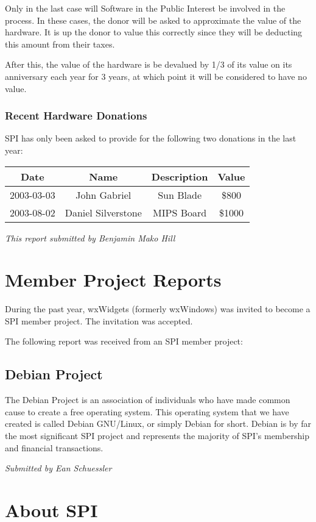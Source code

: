 \documentclass[letterpaper]{report}
\begin{document}
Only in the last case will Software in the Public Interest be involved
in the process. In these cases, the donor will be asked to approximate
the value of the hardware. It is up the donor to value this correctly
since they will be deducting this amount from their taxes.

After this, the value of the hardware is be devalued by 1/3 of its
value on its anniversary each year for 3 years, at which point it
will be considered to have no value.


\subsection{Recent Hardware Donations}

SPI has only been asked to provide for the following two donations
in the last year:

\begin{tabular}{|c|c|c|c|}
\hline
Date & Name & Description & Value\tabularnewline
\hline
\hline
2003-03-03 & John Gabriel & Sun Blade & \$800\tabularnewline
\hline
2003-08-02 & Daniel Silverstone & MIPS Board & \$1000\tabularnewline
\hline
\end{tabular}

\emph{This report submitted by Benjamin Mako Hill}


\chapter{Member Project Reports}

During the past year, wxWidgets (formerly wxWindows) was invited to
become a SPI member project. The invitation was accepted.

The following report was received from an SPI member project:


\section{Debian Project}

The Debian Project is an association of individuals who have made
common cause to create a free operating system. This operating system
that we have created is called Debian GNU/Linux, or simply Debian
for short. Debian is by far the most significant SPI project and represents
the majority of SPI's membership and financial transactions.

\emph{Submitted by Ean Schuessler}

\appendix

\chapter{About SPI}
\end{document}
